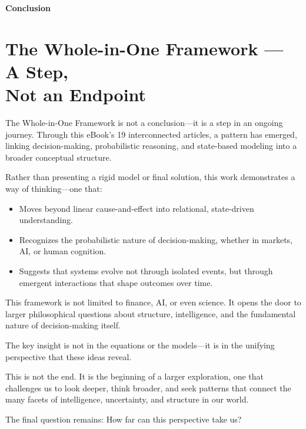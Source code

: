 \documentclass{article}
\newcommand{\bn}{\bigskip\noindent}
\newcommand{\mn}{\medskip\noindent}
\begin{document}
\mn
{\huge\bf Conclusion}

\bn


\bn
\section*{The Whole-in-One Framework --- A Step,\\ Not an Endpoint  }


The Whole-in-One Framework is not a conclusion---it is a step in an ongoing journey. Through this eBook's 19 interconnected articles, a pattern has emerged, linking decision-making, probabilistic reasoning, and state-based modeling into a broader conceptual structure.  

Rather than presenting a rigid model or final solution, this work demonstrates a way of thinking---one that:  

\begin{itemize}
\item  Moves beyond linear cause-and-effect into relational, state-driven understanding.  
\item Recognizes the probabilistic nature of decision-making, whether in markets, AI, or human cognition.  
\item  Suggests that systems evolve not through isolated events, but through emergent interactions that shape outcomes over time.  
\end{itemize}


\bn
This framework is not limited to finance, AI, or even science. It opens the door to larger philosophical questions about structure, intelligence, and the fundamental nature of decision-making itself.  

\bn
The key insight is not in the equations or the models---it is in the unifying perspective that these ideas reveal.  

\bn
This is not the end. It is the beginning of a larger exploration, one that challenges us to look deeper, think broader, and seek patterns that connect the many facets of intelligence, uncertainty, and structure in our world.  

\bn
The final question remains: How far can this perspective take us?  
\end{document}
